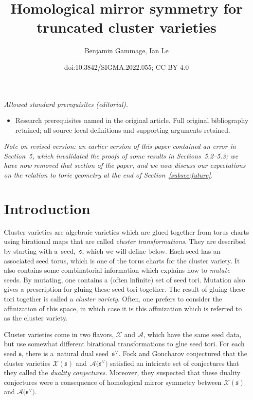 \documentclass[10pt,a4paper]{amsart}
\title{Homological mirror symmetry for truncated cluster varieties}
\author{Benjamin Gammage, Ian Le}
\date{doi:10.3842/SIGMA.2022.055; CC BY 4.0}
\numberwithin{equation}{section}
\newcommand\frs{\mathfrak{s}}
\begin{document}
\maketitle
\noindent\textit{Allowed standard prerequisites (editorial).}\begin{itemize}
\item Research prerequisites named in the original article. Full original bibliography retained; all source-local definitions and supporting arguments retained.
\end{itemize}\medskip
\textit{Note on revised version: an earlier version of this paper contained an error in Section~{\rm 5}, which invalidated the proofs of some results in Sections~{\rm 5.2--5.3}; we have now removed that section of the paper, and we now discuss our expectations on the relation to toric geometry at the end of Section~{\rm \ref{subsec:future}}.}

\section{Introduction}
Cluster varieties are algebraic varieties which are glued together from torus charts using birational maps that are called \emph{cluster transformations}. They are described by starting with a~seed,~$\frs$, which we will define below. Each seed has an associated seed torus, which is one of the torus charts for the cluster variety. It also contains some combinatorial information which explains how to \emph{mutate} seeds. By mutating, one contains a (often infinite) set of seed tori. Mutation also gives a prescription for gluing these seed tori together. The result of gluing these tori together is called a \emph{cluster variety}. Often, one prefers to consider the affinization of this space, in which case it is this affinization which is referred to as the cluster variety.

Cluster varieties come in two flavors, $\mathcal{X}$ and $\mathcal{A}$, which have the same seed data, but use somewhat different birational transformations to glue seed tori. For each seed $\frs$, there is a~natu\-ral dual seed~$\frs^\vee$. Fock and Goncharov conjectured that the cluster varieties $\mathcal{X}(\frs)$ and~$\mathcal{A}\big(\frs^\vee\big)$ satisfied an intricate set of conjectures that they called the \emph{duality conjectures}. Moreover, they suspected that these duality conjectures were a consequence of homological mirror symmetry between $\mathcal{X}(\frs)$ and $\mathcal{A}\big(\frs^\vee\big)$.
\end{document}

